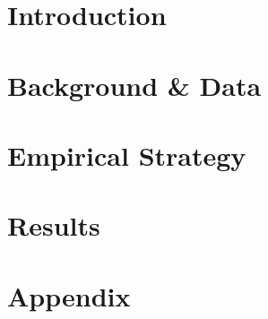 \documentclass[12pt]{article}
\begin{document}
\doublespacing

% 

\section{Introduction} \label{sec:introduction}






\section{Background \& Data} \label{sec:data}



\section{Empirical Strategy} \label{sec:empirical}



\section{Results} \label{sec:result}





\singlespacing
\setlength\bibsep{0pt}

% 



\clearpage

\appendix
\section*{Appendix} \label{sec:appendix}

\end{document}
